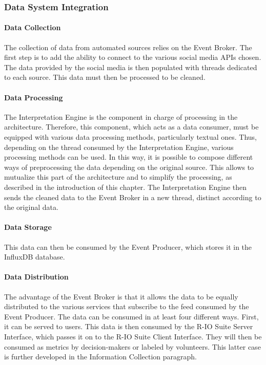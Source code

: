 \subsubsection{Data System Integration}
\paragraph{Data Collection}
The collection of data from automated sources relies on the Event Broker.
The first step is to add the ability to connect to the various social media APIs chosen.
The data provided by the social media is then populated with threads dedicated to each source.
This data must then be processed to be cleaned.
\paragraph{Data Processing}
The Interpretation Engine is the component in charge of processing in the architecture.
Therefore, this component, which acts as a data consumer, must be equipped with various data processing methods, particularly textual ones.
Thus, depending on the thread consumed by the Interpretation Engine, various processing methods can be used.
In this way, it is possible to compose different ways of preprocessing the data depending on the original source.
This allows to mutualize this part of the architecture and to simplify the processing, as described in the introduction of this chapter.
The Interpretation Engine then sends the cleaned data to the Event Broker in a new thread, distinct according to the original data.
\paragraph{Data Storage}
This data can then be consumed by the Event Producer, which stores it in the InfluxDB database.
\paragraph{Data Distribution}
The advantage of the Event Broker is that it allows the data to be equally distributed to the various services that subscribe to the feed consumed by the Event Producer.
The data can be consumed in at least four different ways.
First, it can be served to users.
This data is then consumed by the R-IO Suite Server Interface, which passes it on to the R-IO Suite Client Interface.
They will then be consumed as metrics by decision-makers or labeled by volunteers.
This latter case is further developed in the Information Collection paragraph.

